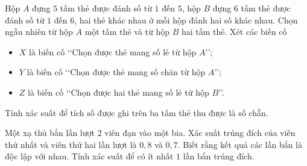 \begin{ex}%
	Hộp $A$ đựng $5$  tấm thẻ được đánh số từ $1$ đến $5$, hộp $B$ đựng $6$ tấm thẻ được đánh số từ $1$ đến $6$, hai thẻ khác nhau ở mỗi hộp đánh hai số khác nhau. Chọn ngẫu nhiên từ hộp $A$ một tấm thẻ và từ hộp $B$ hai tấm thẻ. Xét các biến cố
	\begin{itemize}
		\item $X$ là biến cố \lq\lq Chọn  được thẻ mang số lẻ từ hộp $A$\rq\rq;
		\item  $Y$ là biến cố \lq\lq Chọn được thẻ mang số chăn từ hộp $A$\rq\rq;
		\item $Z$ là biến cố \lq\lq Chọn được hai  thẻ mang số lẻ từ hộp $B$\rq\rq.
	\end{itemize}
	Tính xác suất để tích số được ghi trên ba tấm  thẻ thu được là số chẵn.
\end{ex}

\begin{ex}%
	Một xạ thủ bắn lần lượt $2$ viên đạn vào một bia. Xác suất trúng đích của viên thứ nhất và viên thứ hai lần lượt là $0{,}8$ và $0{,}7$. Biết rằng kết quả  các lần bắn là độc lập với nhau. Tính xác suất để có ít nhất $1$ lần bắn trúng đích.
\end{ex}

